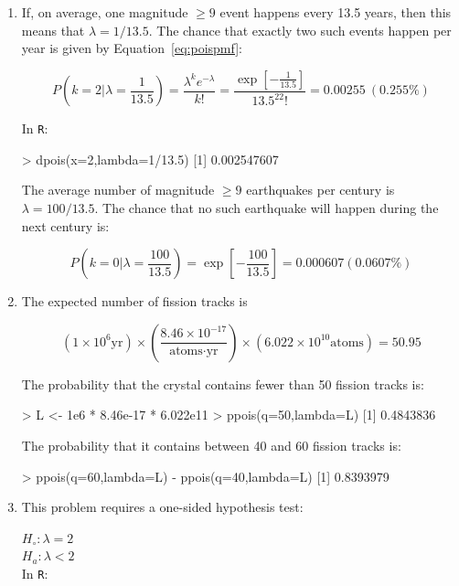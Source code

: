 \begin{enumerate}
\item If, on average, one magnitude $\geq{9}$ event happens every 13.5
  years, then this means that $\lambda=1/13.5$. The chance that
  exactly two such events happen per year is given by
  Equation~\ref{eq:poispmf}:

  \[
  P\left(k=2|\lambda=\frac{1}{13.5}\right) = \frac{\lambda^k
    e^{-\lambda}}{k!} = \frac{\exp\left[-\frac{1}{13.5}\right]}{13.5^22!} =
  0.00255 ~ (0.255\%)
  \]

  In \texttt{R}:

\begin{console}
> dpois(x=2,lambda=1/13.5)
[1] 0.002547607
\end{console}

The average number of magnitude $\geq{9}$ earthquakes per century is
$\lambda={100/13.5}$. The chance that no such earthquake will happen
during the next century is:

  \[
  P\left(k=0|\lambda=\frac{100}{13.5}\right) =
  \exp\left[{-\frac{100}{13.5}}\right] =
  0.000607 (0.0607\%)
  \]

\item The expected number of fission tracks is

  \[
  (1\times{10}^{6}\mbox{yr})
  \times
  \left(\frac{{8.46}\times{10}^{-17}}{\mbox{atoms}\cdot\mbox{yr}}\right)
  \times({6.022}\times{10}^{10}\mbox{atoms})=50.95
  \]

  The probability that the crystal contains fewer
  than 50 fission tracks is:

\begin{console}
> L <- 1e6 * 8.46e-17 * 6.022e11
> ppois(q=50,lambda=L)
[1] 0.4843836
\end{console}

The probability that it contains between 40 and 60 fission tracks is:

\begin{console}
> ppois(q=60,lambda=L) - ppois(q=40,lambda=L)
[1] 0.8393979
\end{console}

\item This problem requires a one-sided hypothesis test:

  $H_\circ: \lambda=2$\\
  $H_a: \lambda<2$\\

  In \texttt{R}:



\end{enumerate}
